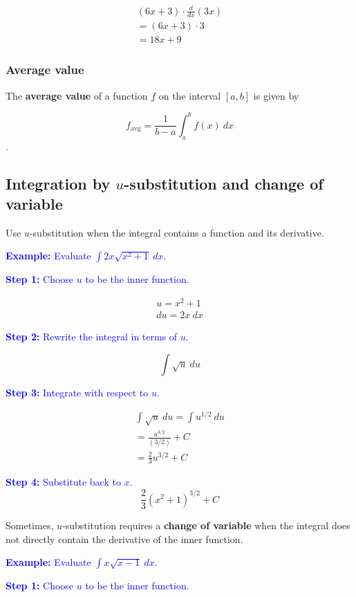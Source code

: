 \documentclass[letterpaper, 12pt]{article}
\newcommand{\example}[1]{\textcolor{blue}{\textbf{Example:} #1}}
\newcommand{\step}[2]{\textcolor{blue}{\textbf{Step #1:} #2}}
\begin{document}
\begin{gather*}
(6x + 3) \cdot \frac{d}{dx}(3x) \\
= (6x + 3) \cdot 3 \\
= \boxed{18x + 9}
\end{gather*}

\subsubsection*{Average value}

The \textbf{average value} of a function $f$ on the interval $[a, b]$ is given by

$$f_{\text{avg}} = \frac{1}{b - a} \int_{a}^{b} f(x) \: dx$$.

\subsection*{Integration by $u$-substitution and change of variable}

Use $u$-substitution when the integral contains a function and its derivative.

\example{Evaluate $\displaystyle \int 2x \sqrt{x^2 + 1} \: dx$.}

\step{1}{Choose $u$ to be the inner function.}

\begin{gather*}
u = x^2 + 1 \\
du = 2x \: dx
\end{gather*}

\step{2}{Rewrite the integral in terms of $u$.}

$$\int \sqrt{u} \: du$$

\step{3}{Integrate with respect to $u$.}

\begin{gather*}
\int \sqrt{u} \: du = \int u^{1/2} \: du \\
= \frac{u^{3/2}}{(3/2)} + C \\
= \frac{2}{3} u^{3/2} + C
\end{gather*}

\step{4}{Substitute back to $x$.}
$$\boxed{\frac{2}{3} (x^2 + 1)^{3/2} + C}$$

Sometimes, $u$-substitution requires a \textbf{change of variable} when the integral does not directly contain the derivative of the inner function.

\example{Evaluate $\displaystyle \int x\sqrt{x-1} \: dx$.}

\step{1}{Choose $u$ to be the inner function.}
\end{document}
